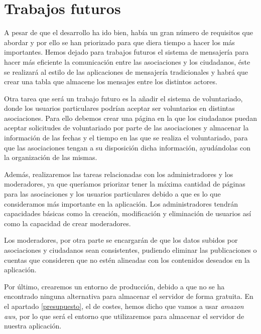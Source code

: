 	
\section{Trabajos futuros}

A pesar de que el desarrollo ha ido bien, había un gran número de requisitos que abordar y por ello se han priorizado para que diera tiempo a hacer los más importantes. Hemos dejado para trabajos futuros el sistema de mensajería para hacer más eficiente la comunicación entre las asociaciones y los ciudadanos, éste se realizará al estilo de las aplicaciones de mensajería tradicionales y habrá que crear una tabla que almacene los mensajes entre los distintos actores.

Otra tarea que será un trabajo futuro es la añadir el sistema de voluntariado, donde los usuarios particulares podrían aceptar ser voluntarios en distintas asociaciones. Para ello debemos crear una página en la que los ciudadanos puedan aceptar solicitudes de voluntariado por parte de las asociaciones y almacenar la información de las fechas y el tiempo en las que se realiza el voluntariado, para que las asociaciones tengan a su disposición dicha información, ayudándolas con la organización de las mismas. 

Además, realizaremos las tareas relacionadas con los administradores y los moderadores, ya que queríamos priorizar tener la máxima cantidad de páginas para las asociaciones y los usuarios particulares debido a que es lo que consideramos más importante en la aplicación. Los administradores tendrán capacidades básicas como la creación, modificación y eliminación de usuarios así como la capacidad de crear moderadores. 

Los moderadores, por otra parte se encargarán de que los datos subidos por asociaciones y ciudadanos sean consistentes, pudiendo eliminar las publicaciones o cuentas que consideren que no estén alineadas con los contenidos deseados en la aplicación.

Por último, crearemos un entorno de producción, debido a que no se ha encontrado ninguna alternativa para almacenar el servidor de forma gratuita. En el apartado \ref{presupuesto}, el de costes, hemos dicho que vamos a usar \textit{amazon aws}, por lo que será el entorno que utilizaremos para almacenar el servidor de nuestra aplicación.



